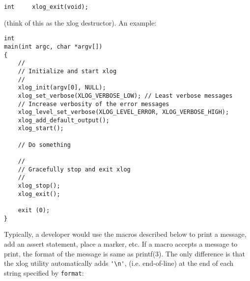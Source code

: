 \documentclass[11pt]{article}
\begin{document}
\begin{itemize}
\begin{verbatim}
int     xlog_exit(void);
\end{verbatim}

	(think of this as the xlog destructor).
	An example:

\begin{verbatim}
int
main(int argc, char *argv[])
{
    //
    // Initialize and start xlog
    //
    xlog_init(argv[0], NULL);
    xlog_set_verbose(XLOG_VERBOSE_LOW);	// Least verbose messages
    // Increase verbosity of the error messages
    xlog_level_set_verbose(XLOG_LEVEL_ERROR, XLOG_VERBOSE_HIGH);
    xlog_add_default_output();
    xlog_start();

    // Do something

    //
    // Gracefully stop and exit xlog
    //
    xlog_stop();
    xlog_exit();

    exit (0);
}
\end{verbatim}

\end{itemize}


Typically, a developer would use the macros described below
to print a message, add an assert statement, place a marker, etc.
If a macro accepts a message to print, the format of the message is same
as printf(3). The only difference is that the xlog utility automatically
adds \verb='\n'=, (i.e. end-of-line) at the end of each string
specified by \verb=format=:
\end{document}

